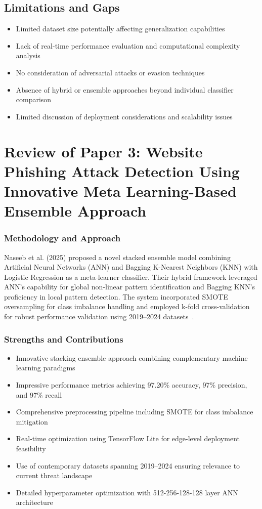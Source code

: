 \subsection*{Limitations and Gaps}
\begin{itemize}
	\item Limited dataset size potentially affecting generalization capabilities
	\item Lack of real-time performance evaluation and computational complexity analysis
	\item No consideration of adversarial attacks or evasion techniques
	\item Absence of hybrid or ensemble approaches beyond individual classifier comparison
	\item Limited discussion of deployment considerations and scalability issues
	
		
	\end{itemize}
	
\section{Review of Paper 3: Website Phishing Attack Detection Using Innovative Meta Learning-Based Ensemble Approach}
	
	\subsubsection{Methodology and Approach}
	Naseeb et al. (2025) proposed a novel stacked ensemble model combining Artificial Neural Networks (ANN) and Bagging K-Nearest Neighbors (KNN) with Logistic Regression as a meta-learner classifier. Their hybrid framework leveraged ANN’s capability for global non-linear pattern identification and Bagging KNN’s proficiency in local pattern detection. The system incorporated SMOTE oversampling for class imbalance handling and employed k-fold cross-validation for robust performance validation using 2019--2024 datasets~\cite{ref3}.
	
	\subsubsection{Strengths and Contributions}
	\begin{itemize}
		\item Innovative stacking ensemble approach combining complementary machine learning paradigms
		\item Impressive performance metrics achieving 97.20\% accuracy, 97\% precision, and 97\% recall
		\item Comprehensive preprocessing pipeline including SMOTE for class imbalance mitigation
		\item Real-time optimization using TensorFlow Lite for edge-level deployment feasibility
		\item Use of contemporary datasets spanning 2019--2024 ensuring relevance to current threat landscape
		\item Detailed hyperparameter optimization with 512-256-128-128 layer ANN architecture
	\end{itemize}
	
